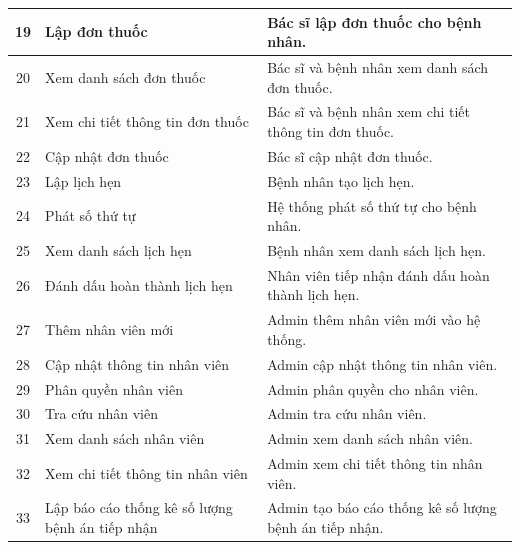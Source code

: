 \begin{longtable}{|c|p{4cm}|p{8cm}|}
  \hline
  19 & Lập đơn thuốc & Bác sĩ lập đơn thuốc cho bệnh nhân. \\
  \hline
  20 & Xem danh sách đơn thuốc & Bác sĩ và bệnh nhân xem danh sách đơn thuốc. \\
  \hline
  21 & Xem chi tiết thông tin đơn thuốc & Bác sĩ và bệnh nhân xem chi tiết thông tin đơn thuốc. \\
  \hline
  22 & Cập nhật đơn thuốc & Bác sĩ cập nhật đơn thuốc. \\
  \hline
  23 & Lập lịch hẹn & Bệnh nhân tạo lịch hẹn. \\
  \hline
  24 & Phát số thứ tự & Hệ thống phát số thứ tự cho bệnh nhân. \\
  \hline
  25 & Xem danh sách lịch hẹn & Bệnh nhân xem danh sách lịch hẹn. \\
  \hline
  26 & Đánh dấu hoàn thành lịch hẹn & Nhân viên tiếp nhận đánh dấu hoàn thành lịch hẹn. \\
  \hline
  27 & Thêm nhân viên mới & Admin thêm nhân viên mới vào hệ thống. \\
  \hline
  28 & Cập nhật thông tin nhân viên & Admin cập nhật thông tin nhân viên. \\
  \hline
  29 & Phân quyền nhân viên & Admin phân quyền cho nhân viên. \\
  \hline
  30 & Tra cứu nhân viên & Admin tra cứu nhân viên. \\
  \hline
  31 & Xem danh sách nhân viên & Admin xem danh sách nhân viên. \\
  \hline
  32 & Xem chi tiết thông tin nhân viên & Admin xem chi tiết thông tin nhân viên. \\
  \hline
  33 & Lập báo cáo thống kê số lượng bệnh án tiếp nhận & Admin tạo báo cáo thống kê số lượng bệnh án tiếp nhận. \\
  \hline
\end{longtable}